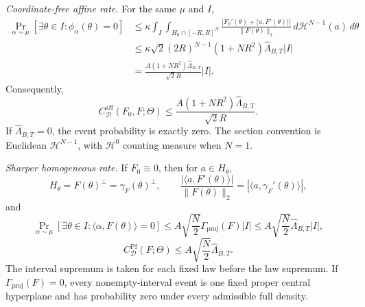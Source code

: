\begin{theorem}
\emph{Coordinate-free affine rate.} For the same $\mu$ and $I$,
\begin{equation}
\label{eq:main-display-004}
\begin{aligned}
\Pr_{\alpha\sim\mu}[\exists\theta\in I:\phi_\alpha(\theta)=0]
&\leq\kappa\int_I\int_{H_\theta\cap[-R,R]^N}
\frac{|F_0'(\theta)+\langle a,F'(\theta)\rangle|}{\|F(\theta)\|_2}
\,d\mathcal H^{N-1}(a)\,d\theta\\
&\leq\kappa\sqrt2(2R)^{N-1}(1+NR^2)\widehat\Lambda_{B,T}|I|\\
&=\frac{A(1+NR^2)\widehat\Lambda_{B,T}}{\sqrt2R}|I|.
\end{aligned}
\end{equation}
Consequently,
\begin{equation}
\label{eq:main-display-005}
C^{\mathrm{aff}}_{\mathcal D}(F_0,F;\Theta)
\leq\frac{A(1+NR^2)\widehat\Lambda_{B,T}}{\sqrt2R}.
\end{equation}
If $\widehat\Lambda_{B,T}=0$, the event probability is exactly zero. The section convention is Euclidean
$\mathcal H^{N-1}$, with $\mathcal H^0$ counting measure when $N=1$.

\emph{Sharper homogeneous rate.} If $F_0\equiv0$, then for $a\in H_\theta$,
\begin{equation}
\label{eq:main-display-006}
H_\theta=F(\theta)^\perp=\gamma_F(\theta)^\perp,\qquad
\frac{|\langle a,F'(\theta)\rangle|}{\|F(\theta)\|_2}=|\langle a,\gamma_F'(\theta)\rangle|,
\end{equation}
and
\begin{equation}
\label{eq:main-display-007}
\Pr_{\alpha\sim\mu}[\exists\theta\in I:\langle\alpha,F(\theta)\rangle=0]
\leq A\sqrt{\frac N2}\Gamma_{\mathrm{proj}}(F)|I|
\leq A\sqrt{\frac N2}\widehat\Lambda_{B,T}|I|,
\end{equation}
\begin{equation}
\label{eq:main-display-008}
C^{\mathrm{Pf}}_{\mathcal D}(F;\Theta)
\leq A\sqrt{\frac N2}\widehat\Lambda_{B,T}.
\end{equation}
The interval supremum is taken for each fixed law before the law supremum. If
$\Gamma_{\mathrm{proj}}(F)=0$, every nonempty-interval event is one fixed proper central hyperplane and has
probability zero under every admissible full density.


\end{theorem}
